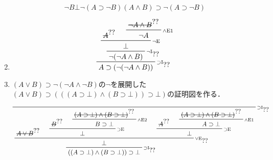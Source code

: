 \documentclass[11pt,dvipdfmx]{jreport}
\begin{document}
\begin{enumerate}
\begin{displaymath}
{{{                           {\neg B}
                         }
                         {\bot}
               }
               {\neg (A \supset \neg B)}
             }
             {(A \land B) \supset \neg (A \supset \neg B)}
   \end{displaymath}\vspace{.2ex}
 \item
   \begin{displaymath}
     \setcounter{prfassumptioncounter}{0}
     \prftree[r]{$\scriptstyle\supset\mathrm{I}_{\prfref<assum:A3>}$}
             {\prftree[r]{$\scriptstyle\neg\mathrm{I}_{\prfref<assum:ABbot3>}$}
               {\prfinterspace=1.5em
                 \prftree[r]{$\scriptstyle\neg\mathrm{E}$}
                         {\prfboundedstyle=1\prfboundedassumption<assum:A3>{A}}      
                         {\prftree[r]{$\scriptstyle\land\mathrm{E1}$}
                           {\prfboundedstyle=1\prfboundedassumption<assum:ABbot3>{\neg A \land B}}      
                           {\neg A}
                         }
                         {\bot}
               }
               {\neg (\neg A \land B)}
             }
             {A \supset (\neg (\neg A \land B))}
   \end{displaymath}\vspace{.2ex}
 \item $(A \lor B) \supset \neg(\neg A \land \neg B)$の$\neg$を展開した$(A \lor B) \supset (((A \supset \bot) \land (B \supset \bot)) \supset \bot)$の証明図を作る．
\begin{displaymath}
\setcounter{prfassumptioncounter}{0}
\prftree[r]{$\scriptstyle\supset\mathrm{I}_{\prfref<assum:AB4>}$}
 {\prftree[r]{$\scriptstyle\supset\mathrm{I}_{\prfref<assum:ABbot4>}$}
   {\prfinterspace=1.5em
    \prftree[r]{$\scriptstyle\lor\mathrm{E}_{\prfref<assum:AorB4>}$}
     {\prfboundedstyle=1\prfboundedassumption<assum:AB4>{A \lor B}}
     {\prftree[r]{$\scriptstyle\supset\mathrm{E}$}
      {\prfboundedstyle=1\prfboundedassumption<assum:AorB4>{B}}
      {\prftree[r]{$\scriptstyle\land\mathrm{E2}$}
       {\prfboundedstyle=1\prfboundedassumption<assum:ABbot4>{(A \supset \bot) \land (B \supset \bot)}}
       {B \supset \bot}
      }
      {\bot}
     }
     {\prftree[r]{$\scriptstyle\supset\mathrm{E}$}
      {\prfboundedstyle=1\prfboundedassumption<assum:AorB4>{A}}
      {\prftree[r]{$\scriptstyle\land\mathrm{E1}$}
       {\prfboundedstyle=1\prfboundedassumption<assum:ABbot4>{(A \supset \bot) \land (B \supset \bot)}}
       {A \supset \bot}
      }
      {\bot}
     }
    {\bot}
   }
  {((A \supset \bot) \land (B \supset \bot)) \supset \bot}
}
\end{displaymath}
\end{enumerate}
\end{document}
